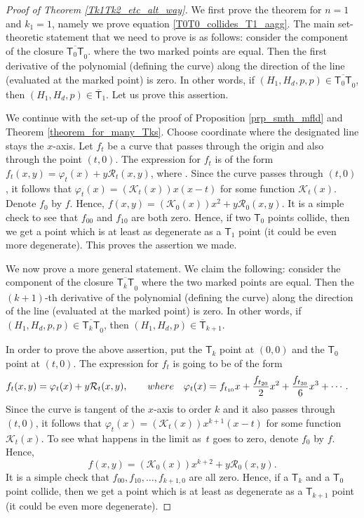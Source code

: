 \documentclass[11pt]{article}
\numberwithin{equation}{section}
\begin{document}
\begin{proof}[Proof of Theorem \ref{Tk1Tk2_etc_alt_way}]
We first prove the theorem for $n = 1$ and $k_1 = 1$, namely
we prove equation \eqref{T0T0_collides_T1_aagg}.
The main set-theoretic statement that we need to prove is as follows:
consider the component of the closure $\overline{\mathsf{T}_0 \mathsf{T}}_0$.
where the two marked points are equal. Then the first derivative of the
polynomial (defining the curve) along the direction of the line
(evaluated at the marked point) is zero. In other words, if
$(H_1, H_d, p, p) \in \overline{\mathsf{T}_0 \mathsf{T}}_0$, then
$(H_1, H_d, p) \in \overline{\mathsf{T}}_1$. Let us prove this assertion.

We continue with the set-up of the proof of Proposition \ref{prp_smth_mfld}
and Theorem \ref{theorem_for_many_Tks}.
Choose coordinate where the designated line stays the $x$-axis.
Let $f_t$ be a curve that passes through the origin and also through the point $(t, 0)$.
The expression for $f_t$ is of the form
$
f_t(x, y)  =  \varphi_t(x)+ y \mathcal{R}_t(x, y)$,
where .
Since the curve passes through $(t, 0)$, it follows that
$
\varphi_{t}(x)  =  (\mathcal{K}_t(x))x(x-t)
$
for some function $\mathcal{K}_t(x)$. Denote $f_0$ by $f$. Hence,
$
f(x, y) =  (\mathcal{K}_0(x))x^2 + y \mathcal{R}_0(x, y)$.
It is a simple check to see that $f_{00}$ and $f_{10}$ are both zero.
Hence, if two $\mathsf{T}_0$ points collide, then we get a point which is at least as degenerate as a
$\mathsf{T}_1$ point (it could be even more degenerate). This proves the
assertion we made.

We now prove a more general statement.
We claim the following:
consider the component of the closure $\overline{\mathsf{T}_{k} \mathsf{T}}_0$
where the two marked points are equal. Then the $(k+1)$-th derivative of the
polynomial (defining the curve) along the direction of the line
(evaluated at the marked point) is zero. In other words, if
$(H_1, H_d, p, p) \in \overline{\mathsf{T}_{k} \mathsf{T}}_0$, then
$(H_1, H_d, p) \in \overline{\mathsf{T}}_{k+1}$.

In order to prove the above assertion, put the
$\mathsf{T}_k$ point at $(0, 0)$ and the $\mathsf{T}_0$ point at $(t, 0)$.
The expression for $f_t$ is going to be of the form
\begin{align*}
f_t(x, y)& = \varphi_t(x)+ y \mathcal{R}_t(x, y),\qquad
\textnormal{where} \quad \varphi_{t}(x) =  f_{t_{10}} x + \frac{f_{t_{20}}}{2} x^2 + \frac{f_{t_{30}}}{6} x^3 + \cdots .
\end{align*}
Since the curve is tangent of the $x$-axis to order $k$ and it also passes through $(t, 0)$,
it follows that
$
\varphi_{t}(x)  =  (\mathcal{K}_t(x))x^{k+1}(x-t)
$
for some function $\mathcal{K}_t(x)$. To see what happens in the limit as~$t$ goes to zero, denote $f_0$ by $f$.
Hence,
\[
f(x, y) =  (\mathcal{K}_0(x))x^{k+2} + y \mathcal{R}_0(x, y).
\]
It is a simple check that $f_{00}, f_{10}, \dots, f_{k+1, 0}$ are all zero.
Hence, if a $\mathsf{T}_k$ and a $\mathsf{T}_0$ point collide, then
we get a point which is at least as degenerate as a $\mathsf{T}_{k+1}$ point (it could be even more degenerate).


\end{proof}
\end{document}
